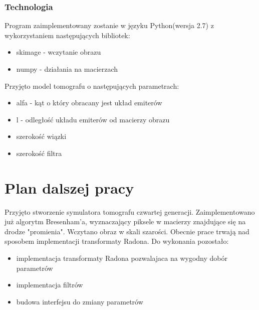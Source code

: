 \documentclass[A_4paper,12pt]{article}
\begin{document}
\subsubsection{Technologia}
Program zaimplementowany zostanie w języku Python(wersja 2.7) z wykorzystaniem następujących bibliotek:
\begin{itemize}
\item skimage - wczytanie obrazu
\item numpy - działania na macierzach
\end{itemize}
\newpage
Przyjęto model tomografu o następujących parametrach:
\begin{itemize}
\item alfa - kąt o który obracany jest układ emiterów
\item l - odległość układu emiterów od macierzy obrazu
\item szerokość wiązki
\item szerokość filtra
\end{itemize}

\section{Plan dalszej pracy}
Przyjęto stworzenie symulatora tomografu czwartej generacji. Zaimplementowano już algorytm Bresenham'a, wyznaczający piksele w macierzy znajdujące się na drodze  "promienia". Wczytano obraz w skali szarości. Obecnie prace trwają nad sposobem implementacji transformaty Radona.
Do wykonania pozostało:
\begin{itemize}
\item implementacja transformaty Radona pozwalajaca na wygodny dobór parametrów
\item implementacja filtrów
\item budowa interfejsu do zmiany parametrów
\end{itemize}



\end{document}
